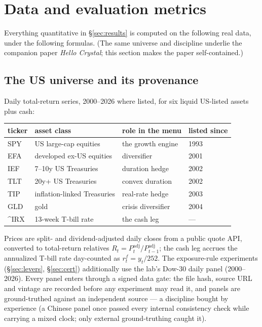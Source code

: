 \documentclass[11pt]{article}
\begin{document}
\section{Data and evaluation metrics}
\label{sec:data}

Everything quantitative in \S\ref{sec:results} is computed on the following real data, under
the following formulas. (The same universe and discipline underlie the companion paper
\emph{Hello Crystal}; this section makes the paper self-contained.)

\subsection{The US universe and its provenance}
\label{sec:universe}

Daily total-return series, 2000--2026 where listed, for six liquid US-listed assets plus cash:
\begin{center}\small
\begin{tabular}{llll}
\toprule
ticker & asset class & role in the menu & listed since \\
\midrule
SPY & US large-cap equities & the growth engine & 1993 \\
EFA & developed ex-US equities & diversifier & 2001 \\
IEF & 7--10y US Treasuries & duration hedge & 2002 \\
TLT & 20y+ US Treasuries & convex duration & 2002 \\
TIP & inflation-linked Treasuries & real-rate hedge & 2003 \\
GLD & gold & crisis diversifier & 2004 \\
\textasciicircum IRX & 13-week T-bill rate & the cash leg & --- \\
\bottomrule
\end{tabular}
\end{center}
Prices are split- and dividend-adjusted daily closes from a public quote API, converted to
total-return relatives $R_t = P^{\text{adj}}_t / P^{\text{adj}}_{t-1}$; the cash leg accrues the
annualized T-bill rate day-counted as $r^{f}_t = y_t/252$. The exposure-rule experiments
(\S\ref{sec:levers}, \S\ref{sec:cert}) additionally use the lab's Dow-30 daily panel
(2000--2026). Every panel enters through a signed data gate: the file hash, source URL and
vintage are recorded before any experiment may read it, and panels are ground-truthed against an
independent source --- a discipline bought by experience (a Chinese panel once passed every
internal consistency check while carrying a mixed clock; only external ground-truthing caught
it).
\end{document}
